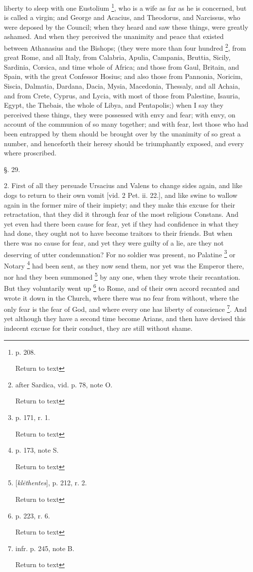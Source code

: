 liberty to sleep with one Eustolium \footnote{p. 208.

Return to text}, who is a wife as far as he is concerned, but is called a
virgin; and George and Acacius, and Theodorus, and Narcissus, who were
deposed by the Council; when they heard and saw these things, were
greatly ashamed. And when they perceived the unanimity and peace that
existed between Athanasius and the Bishops; (they were more than four
hundred \footnote{after Sardica, vid. p. 78, note O.

Return to text}, from great
Rome, and all Italy, from Calabria, Apulia, Campania, Bruttia, Sicily,
Sardinia, Corsica, and time whole of Africa; and those from
Gaul, Britain, and Spain, with the great Confessor Hosius; and also
those from Pannonia, Noricim, Siscia, Dalmatia, Dardana, Dacia, Mysia,
Macedonia, Thessaly, and all Achaia, and from Crete, Cyprus, and Lycia,
with most of those from Palestine, Isauria, Egypt, the Thebais, the
whole of Libya, and Pentapolis;) when I say they perceived these
things, they were possessed with envy and fear; with envy, on account
of the communion of so many together; and with fear, lest those who
had been entrapped by them should be brought over by the unanimity of
so great a number, and henceforth their heresy should be triumphantly
exposed, and every where proscribed.

§. 29.

2. First of all they persuade Ursacius and Valens
to change sides again, and like dogs to return to their own vomit
[vid. 2 Pet. ii. 22.], and like swine to wallow again in the former
mire of their impiety; and they make this excuse for their
retractation, that they did it through fear of the most religious
Constans. And yet even had there been cause for fear, yet if they had
confidence in what they had done, they ought not to have become
traitors to their friends. But when there was no cause for fear, and
yet they were guilty of a lie, are they not deserving of utter
condemnation? For no soldier was present, no Palatine \footnote{p. 171, r. 1.

Return to text} or Notary \footnote{p. 173, note S.

Return to text} had
been sent, as they now send them, nor yet was the Emperor there, nor
had they been summoned \footnote{[\emph{kl\={e}thentes}], p. 212, r. 2.

Return to text}
by any one, when they wrote their recantation. But they voluntarily
went up \footnote{p. 223, r. 6.

Return to text} to Rome, and of
their own accord recanted and wrote it down in the Church, where there
was no fear from without, where the only fear is the fear of God, and
where every one has liberty of conscience \footnote{infr. p. 245, note B.

Return to text}. And yet although they have a second time become Arians, and
then have devised this indecent excuse for their conduct, they are
still without shame.

